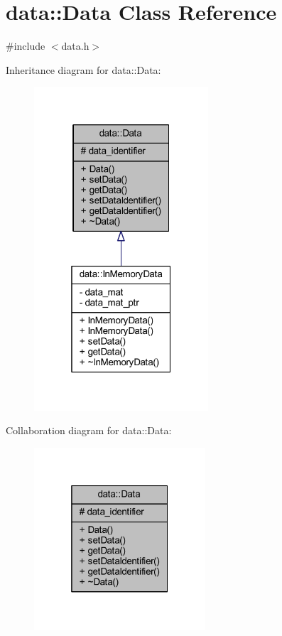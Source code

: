 \hypertarget{classdata_1_1_data}{}\section{data\+:\+:Data Class Reference}
\label{classdata_1_1_data}


{\ttfamily \#include $<$data.\+h$>$}



Inheritance diagram for data\+:\+:Data\+:\nopagebreak
\begin{figure}[H]
\begin{center}
\leavevmode
\includegraphics[width=184pt]{classdata_1_1_data__inherit__graph}
\end{center}
\end{figure}


Collaboration diagram for data\+:\+:Data\+:\nopagebreak
\begin{figure}[H]
\begin{center}
\leavevmode
\includegraphics[width=181pt]{classdata_1_1_data__coll__graph}
\end{center}
\end{figure}
